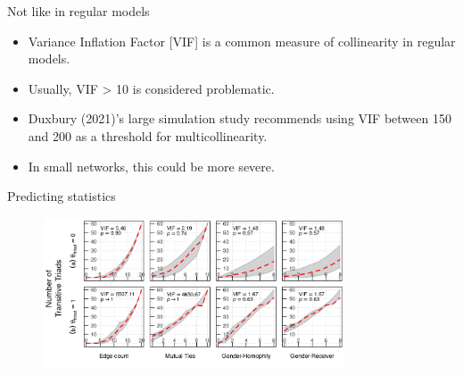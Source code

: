 \documentclass[
  ignorenonframetext,
  aspectratio=169,
]{beamer}
\begin{document}
\begin{frame}{Not like in regular models}
\protect\hypertarget{not-like-in-regular-models}{}
\begin{itemize}
\item
  Variance Inflation Factor {[}VIF{]} is a common measure of
  collinearity in regular models.
\item
  Usually, VIF \textgreater{} 10 is considered problematic.
\item
  Duxbury (2021)'s large simulation study recommends using VIF between
  150 and 200 as a threshold for multicollinearity.
\item
  In small networks, this could be more severe.
\end{itemize}
\end{frame}

\begin{frame}{Predicting statistics}
\protect\hypertarget{predicting-statistics}{}
\begin{figure}

{\centering \includegraphics[width=0.8\textwidth,height=\textheight]{figures/conditional-prob-ttriad.png}

}

\end{figure}
\end{frame}
\end{document}
